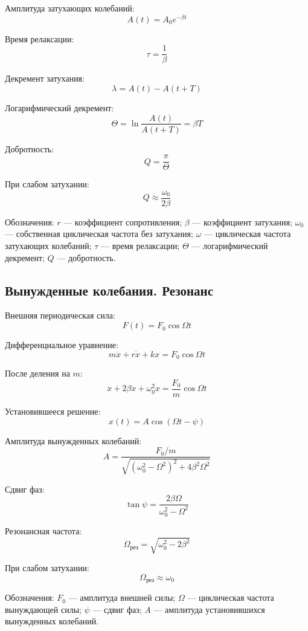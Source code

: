 \documentclass[a4paper,12pt]{article}
\begin{document}
Амплитуда затухающих колебаний:
\[
A\left(t\right) = A_0 e^{-\beta t}
\]

Время релаксации:
\[
\tau = \frac{1}{\beta}
\]

Декремент затухания:
\[
\lambda = A\left(t\right) - A\left(t + T\right)
\]

Логарифмический декремент:
\[
\Theta = \ln \frac{A\left(t\right)}{A\left(t+T\right)} = \beta T
\]

Добротность:
\[
Q = \frac{\pi}{\Theta}
\]

При слабом затухании:
\[
Q \approx \frac{\omega_0}{2\beta}
\]

Обозначения:  
\(r\) — коэффициент сопротивления;  
\(\beta\) — коэффициент затухания;  
\(\omega_0\) — собственная циклическая частота без затухания;  
\(\omega\) — циклическая частота затухающих колебаний;  
\(\tau\) — время релаксации;  
\(\Theta\) — логарифмический декремент;  
\(Q\) — добротность.

\subsection{Вынужденные колебания. Резонанс}

Внешняя периодическая сила:
\[
F\left(t\right) = F_0 \cos\Omega t
\]

Дифференциальное уравнение:
\[
m\ddot x + r\dot x + kx = F_0 \cos\Omega t
\]

После деления на \(m\):
\[
\ddot x + 2\beta \dot x + \omega_0^2 x = \frac{F_0}{m}\cos\Omega t
\]

Установившееся решение:
\[
x\left(t\right) = A \cos\left(\Omega t - \psi\right)
\]

Амплитуда вынужденных колебаний:
\[
A = \frac{F_0 / m}
{\sqrt{\left(\omega_0^2 - \Omega^2\right)^2 + 4\beta^2\Omega^2}}
\]

Сдвиг фаз:
\[
\tan\psi = \frac{2\beta\Omega}{\omega_0^2 - \Omega^2}
\]

Резонансная частота:
\[
\Omega_{\text{рез}} = \sqrt{\omega_0^2 - 2\beta^2}
\]

При слабом затухании:
\[
\Omega_{\text{рез}} \approx \omega_0
\]

Обозначения:  
\(F_0\) — амплитуда внешней силы;  
\(\Omega\) — циклическая частота вынуждающей силы;  
\(\psi\) — сдвиг фаз;  
\(A\) — амплитуда установившихся вынужденных колебаний.
\end{document}
